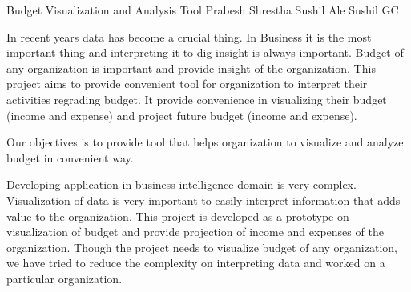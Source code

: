  \begin{conf-abstract}[]
 {Budget Visualization and Analysis Tool }
 {Prabesh Shrestha
 	Sushil Ale
 	Sushil GC
 }
{}

In recent years data has become a crucial thing. In Business it is the most important thing and interpreting it to dig insight is always important. Budget of any organization is important and provide insight of the organization. This project aims to provide convenient tool for organization to interpret their activities regrading budget. It provide convenience in visualizing their budget (income and expense) and project future budget (income and expense). 

Our objectives is to provide tool that helps organization to visualize and analyze budget in convenient way.

Developing application in business intelligence domain is very complex. Visualization of data is very important to easily interpret information that adds value to the organization. This project is developed as a prototype on visualization of budget and provide projection of income and expenses of the organization. Though the project needs to visualize budget of any organization, we have tried to reduce the complexity on interpreting data and worked on a particular organization. 
 \end{conf-abstract}